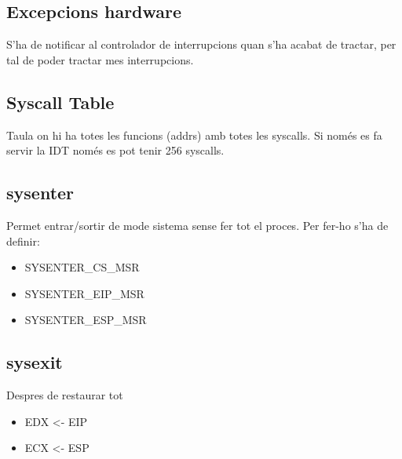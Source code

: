 \documentclass{article}
\begin{document}
    \subsection{Excepcions hardware}

        S'ha de notificar al controlador de interrupcions quan s'ha acabat de tractar, per tal de poder tractar mes interrupcions.

    \subsection{Syscall Table}

        Taula on hi ha totes les funcions (addrs) amb totes les syscalls. Si només es fa servir la IDT només es pot tenir 256 syscalls.

    \subsection{sysenter}

        Permet entrar/sortir de mode sistema sense fer tot el proces.
        Per fer-ho s'ha de definir:
        \begin{itemize}
            \item SYSENTER_CS_MSR
            \item SYSENTER_EIP_MSR
            \item SYSENTER_ESP_MSR
        \end{itemize}

    \subsection{sysexit}
        Despres de restaurar tot
        \begin{itemize}
            \item EDX <- EIP
            \item ECX <- ESP
        \end{itemize}
        
    
\end{document}
